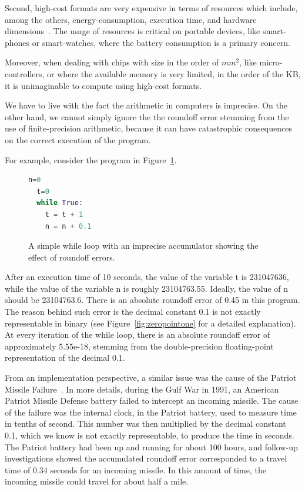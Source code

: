 Second, high-cost formats are very expensive in terms of resources which include, among the others, energy-consumption, execution time, and hardware dimensions~\cite{fppower, lutnet}. 
%
The usage of resources is critical on portable devices, like smart-phones or smart-watches, where the battery consumption is a primary concern.
%

Moreover, when dealing with chips with size in the order of $mm^{2}$, like micro-controllers, or where the available memory is very limited, in the order of the KB, it is unimaginable to compute using high-cost formats.
%

We have to live with the fact the arithmetic in computers is imprecise.
%
On the other hand, we cannot simply ignore the the roundoff error stemming from the use of finite-precision arithmetic, because it can have catastrophic consequences on the correct execution of the program.
%

For example, consider the program in Figure~\ref{fig:while}.
%
\begin{figure}[tb!]
	\begin{lstlisting}[frame=single, language=Python]
  n=0
  t=0
  while True:
    t = t + 1
    n = n + 0.1
	\end{lstlisting}
	\caption{A simple while loop with an imprecise accumulator showing the effect of roundoff errors.}\label{fig:while}
\end{figure}
%
After an execution time of 10 seconds, the value of the variable t is 231047636, while the value of the variable n is roughly 23104763.55.
%
Ideally, the value of n should be 23104763.6.
%
There is an absolute roundoff error of 0.45 in this program.
%
The reason behind such error is the decimal constant 0.1 is not exactly representable in binary (see Figure~\ref{fig:zeropointone} for a detailed explanation). 
%
At every iteration of the while loop, there is an absolute roundoff error of approximately 5.55e-18, stemming from the double-precision floating-point representation of the decimal 0.1. 
%

From an implementation perspective, a similar issue was the cause of the Patriot Missile Failure~\cite{patriot}.
%
In more details, during the Gulf War in 1991, an American Patriot Missile Defense battery failed to intercept an incoming missile.
%
The cause of the failure was the internal clock, in the Patriot battery, used to measure time in tenths of second.
%
This number was then multiplied by the decimal constant 0.1, which we know is not exactly representable, to produce the time in seconds.
%
The Patriot battery had been up and running for about 100 hours, and follow-up investigations showed the accumulated roundoff error corresponded to a travel time of 0.34 seconds for an incoming missile. 
%
In this amount of time, the incoming missile could travel for about half a mile.

